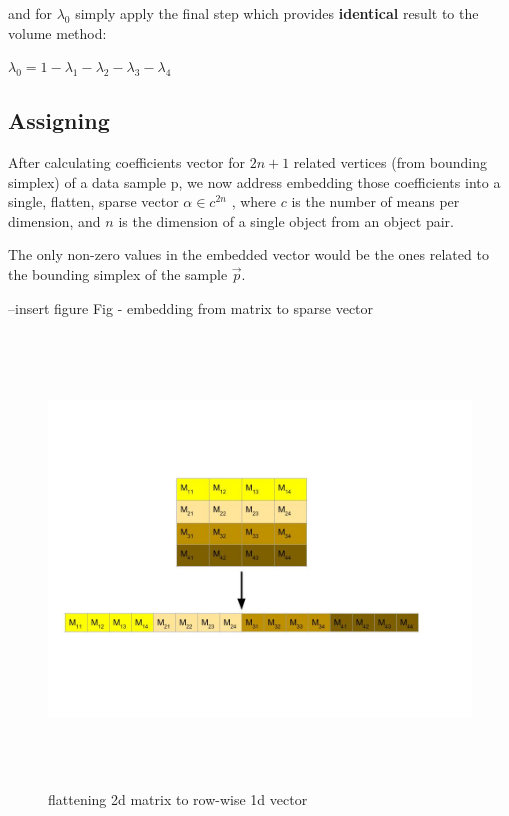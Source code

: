 		
		and for $\lambda_0$ simply apply the final step which provides \textbf{identical} result to the volume method:
		
		$\lambda_0 = 1 - \lambda_1 - \lambda_2 - \lambda_3 - \lambda_4$ \\
		
	\subsection{Assigning}
	
	After calculating coefficients vector for $2n+1$ related vertices (from bounding simplex) of a data sample p, we now address embedding those coefficients into a single, flatten, sparse vector $\alpha \in c^{2n}$ , where $c$ is the number of means per dimension, and $n$ is the dimension of a single object from an object pair.
	
	The only non-zero values in the embedded vector would be the ones related to the bounding simplex of the sample $\overrightarrow{p}$.
	
	
	
	
	--insert figure Fig - embedding from matrix to sparse vector
	
	
	\begin{figure}[h] \label{flatt}
	
		\includegraphics[width=\linewidth,height=12cm,keepaspectratio]{Figures/flatten}
		\caption[flattening 2d matrix]
		{flattening 2d matrix to row-wise 1d vector}
	
	\end{figure}
			
